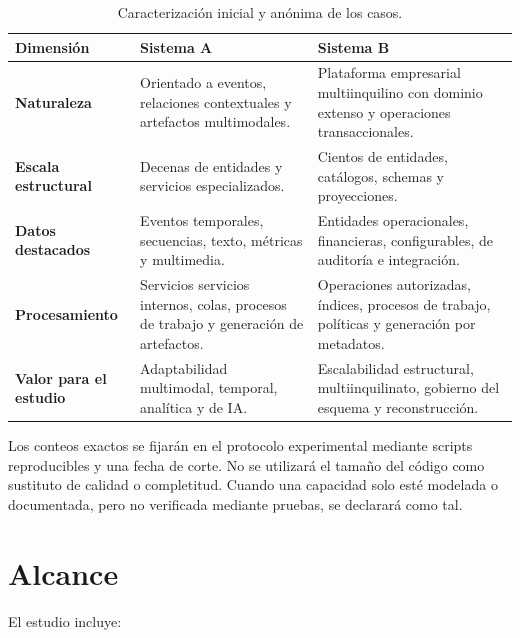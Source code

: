 \begin{table}[H]
\centering
\caption{Caracterización inicial y anónima de los casos.}
\label{tab:casos}
\begin{tabularx}{\textwidth}{>{\bfseries}p{3.2cm}XX}
\toprule
Dimensión & Sistema A & Sistema B \\
\midrule
Naturaleza & Orientado a eventos, relaciones contextuales y artefactos multimodales. &
Plataforma empresarial multiinquilino con dominio extenso y operaciones transaccionales.\\
Escala estructural & Decenas de entidades y servicios especializados. & Cientos de
entidades, catálogos, schemas y proyecciones.\\
Datos destacados & Eventos temporales, secuencias, texto, métricas y multimedia. &
Entidades operacionales, financieras, configurables, de auditoría e integración.\\
Procesamiento & Servicios servicios internos, colas, procesos de trabajo y generación de artefactos. &
Operaciones autorizadas, índices, procesos de trabajo, políticas y generación por metadatos.\\
Valor para el estudio & Adaptabilidad multimodal, temporal, analítica y de IA. &
Escalabilidad estructural, multiinquilinato, gobierno del esquema y reconstrucción.\\
\bottomrule
\end{tabularx}
\end{table}

Los conteos exactos se fijarán en el protocolo experimental mediante scripts
reproducibles y una fecha de corte. No se utilizará el tamaño del código como sustituto
de calidad o completitud. Cuando una capacidad solo esté modelada o documentada, pero no
verificada mediante pruebas, se declarará como tal.

\section{Alcance}

El estudio incluye:

